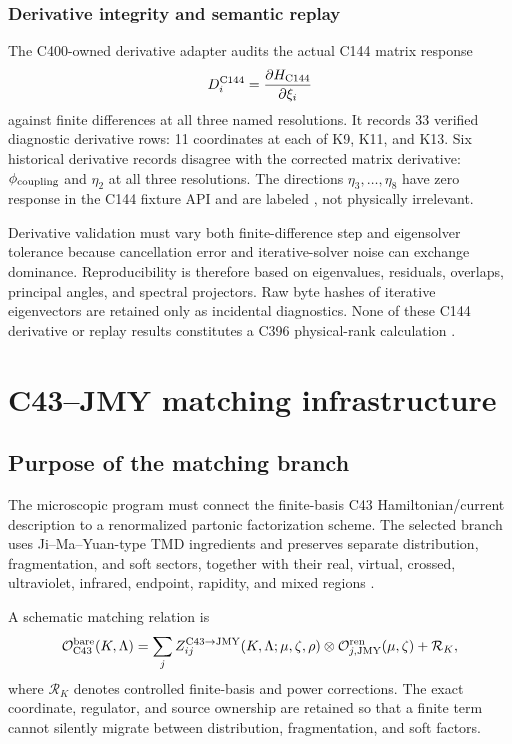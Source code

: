 \documentclass[11pt,oneside]{book}
\newcommand{\statuscode}[1]{\text{\ttfamily\detokenize{#1}}}
\begin{document}
\subsection{Derivative integrity and semantic replay}

The C400-owned derivative adapter audits the actual C144 matrix response
\begin{equation}
 D_i^{\rm C144}=\frac{\partial H_{\rm C144}}{\partial\xi_i}
 \label{eq:c144-matrix-derivative}
\end{equation}
against finite differences at all three named resolutions.  It records 33 verified diagnostic derivative rows: 11 coordinates at each of K9, K11, and K13.  Six historical derivative records disagree with the corrected matrix derivative: $\phi_{\rm coupling}$ and $\eta_2$ at all three resolutions.  The directions $\eta_3,\ldots,\eta_8$ have zero response in the C144 fixture API and are labeled \statuscode{NUMERICALLY_UNBOUND_IN_C144_FIXTURE_API}, not physically irrelevant.

Derivative validation must vary both finite-difference step and eigensolver tolerance because cancellation error and iterative-solver noise can exchange dominance.  Reproducibility is therefore based on eigenvalues, residuals, overlaps, principal angles, and spectral projectors.  Raw byte hashes of iterative eigenvectors are retained only as incidental diagnostics.  None of these C144 derivative or replay results constitutes a C396 physical-rank calculation \cite{DWC400S2Record2026}.

\chapter{C43--JMY matching infrastructure}
\label{chap:c43-jmy}

\section{Purpose of the matching branch}

The microscopic program must connect the finite-basis C43 Hamiltonian/current description to a renormalized partonic factorization scheme.  The selected branch uses Ji--Ma--Yuan-type TMD ingredients and preserves separate distribution, fragmentation, and soft sectors, together with their real, virtual, crossed, ultraviolet, infrared, endpoint, rapidity, and mixed regions \cite{JiMaYuan2005,Collins2011,DWC400S2Record2026}.

A schematic matching relation is
\begin{equation}
 \mathcal O_{\rm C43}^{\rm bare}(K,\Lambda)
 =\sum_j Z_{ij}^{\rm C43\to JMY}(K,\Lambda;\mu,\zeta,\rho)
 \otimes\mathcal O_{j,\rm JMY}^{\rm ren}(\mu,\zeta)
 +\mathcal R_K,
 \label{eq:c43-jmy-matching}
\end{equation}
where $\mathcal R_K$ denotes controlled finite-basis and power corrections.  The exact coordinate, regulator, and source ownership are retained so that a finite term cannot silently migrate between distribution, fragmentation, and soft factors.
\end{document}

